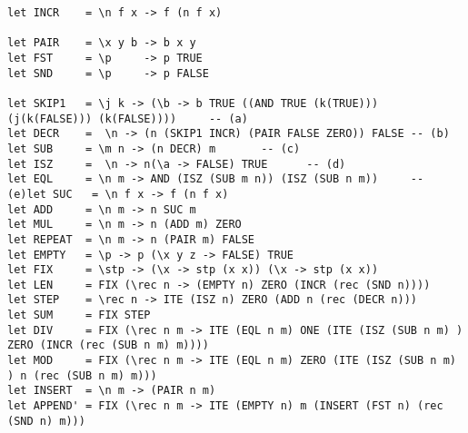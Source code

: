 \documentclass[landscape,8pt]{extarticle}
\begin{document}
\begin{multicols}{4}
\begin{center}
\begin{adjustbox}{angle=270}
\begin{lstlisting}
let INCR    = \n f x -> f (n f x)

let PAIR    = \x y b -> b x y
let FST     = \p     -> p TRUE
let SND     = \p     -> p FALSE

let SKIP1   = \j k -> (\b -> b TRUE ((AND TRUE (k(TRUE))) (j(k(FALSE))) (k(FALSE))))     -- (a)
let DECR    =  \n -> (n (SKIP1 INCR) (PAIR FALSE ZERO)) FALSE -- (b)
let SUB     = \m n -> (n DECR) m       -- (c)
let ISZ     =  \n -> n(\a -> FALSE) TRUE      -- (d)
let EQL     = \n m -> AND (ISZ (SUB m n)) (ISZ (SUB n m))     -- (e)let SUC   = \n f x -> f (n f x)
let ADD     = \n m -> n SUC m
let MUL     = \n m -> n (ADD m) ZERO
let REPEAT  = \n m -> n (PAIR m) FALSE
let EMPTY   = \p -> p (\x y z -> FALSE) TRUE
let FIX     = \stp -> (\x -> stp (x x)) (\x -> stp (x x))
let LEN     = FIX (\rec n -> (EMPTY n) ZERO (INCR (rec (SND n))))
let STEP    = \rec n -> ITE (ISZ n) ZERO (ADD n (rec (DECR n)))
let SUM     = FIX STEP
let DIV     = FIX (\rec n m -> ITE (EQL n m) ONE (ITE (ISZ (SUB n m) ) ZERO (INCR (rec (SUB n m) m))))
let MOD     = FIX (\rec n m -> ITE (EQL n m) ZERO (ITE (ISZ (SUB n m) ) n (rec (SUB n m) m)))
let INSERT  = \n m -> (PAIR n m)
let APPEND' = FIX (\rec n m -> ITE (EMPTY n) m (INSERT (FST n) (rec (SND n) m)))
            \end{lstlisting}
        \end{adjustbox}
    \end{center}
\end{multicols}
\end{document}
